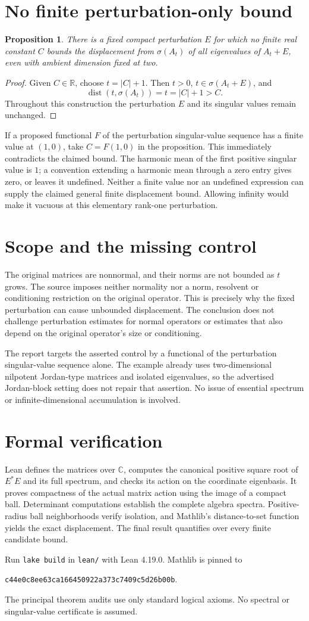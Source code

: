 \documentclass[11pt]{article}
\newtheorem{proposition}{Proposition}
\begin{document}
\newpage
\section*{No finite perturbation-only bound}
\begin{proposition}
There is a fixed compact perturbation $E$ for which no finite real constant $C$ bounds the displacement from $\sigma(A_t)$ of all eigenvalues of $A_t+E$, even with ambient dimension fixed at two.
\end{proposition}
\begin{proof}
Given $C\in\mathbb R$, choose $t=|C|+1$. Then $t>0$, $t\in\sigma(A_t+E)$, and
\[
 \operatorname{dist}(t,\sigma(A_t))=t=|C|+1>C.
\]
Throughout this construction the perturbation $E$ and its singular values remain unchanged.
\end{proof}
If a proposed functional $F$ of the perturbation singular-value sequence has a finite value at $(1,0)$, take $C=F(1,0)$ in the proposition. This immediately contradicts the claimed bound. The harmonic mean of the first positive singular value is $1$; a convention extending a harmonic mean through a zero entry gives zero, or leaves it undefined. Neither a finite value nor an undefined expression can supply the claimed general finite displacement bound. Allowing infinity would make it vacuous at this elementary rank-one perturbation.

\section*{Scope and the missing control}
The original matrices are nonnormal, and their norms are not bounded as $t$ grows. The source imposes neither normality nor a norm, resolvent or conditioning restriction on the original operator. This is precisely why the fixed perturbation can cause unbounded displacement. The conclusion does not challenge perturbation estimates for normal operators or estimates that also depend on the original operator's size or conditioning.

The report targets the asserted control by a functional of the perturbation singular-value sequence alone. The example already uses two-dimensional nilpotent Jordan-type matrices and isolated eigenvalues, so the advertised Jordan-block setting does not repair that assertion. No issue of essential spectrum or infinite-dimensional accumulation is involved.

\section*{Formal verification}
Lean defines the matrices over $\mathbb C$, computes the canonical positive square root of $E^*E$ and its full spectrum, and checks its action on the coordinate eigenbasis. It proves compactness of the actual matrix action using the image of a compact ball. Determinant computations establish the complete algebra spectra. Positive-radius ball neighborhoods verify isolation, and Mathlib's distance-to-set function yields the exact displacement. The final result quantifies over every finite candidate bound.

Run \texttt{lake build} in \texttt{lean/} with Lean 4.19.0. Mathlib is pinned to
\begin{center}\small\texttt{c44e0c8ee63ca166450922a373c7409c5d26b00b}.\end{center}
The principal theorem audits use only standard logical axioms. No spectral or singular-value certificate is assumed.
\end{document}
